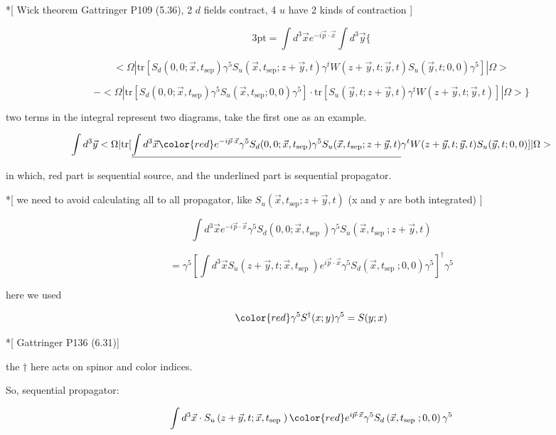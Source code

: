 \documentclass[11pt]{article} %
\begin{document}
*[ Wick theorem Gattringer P109 (5.36), 2 $d$ fields contract, 4 $u$ have 2 kinds of contraction ]

\[ \text{3pt} = \int d^{3} \vec{x} e^{-i \vec{p} \cdot \vec{x}} \int d^3 \vec{y} \{ \]

\[ <\Omega| \text{tr}[ S_d(0,0;\vec{x},t_{\text{sep}}) \gamma^{5} S_u(\vec{x},t_{\text{sep}};z+\vec{y},t) \gamma^{t} W(z+\vec{y}, t ; \vec{y}, t) S_u(\vec{y},t;0,0) \gamma^{5}  ] |\Omega> \]

\[ - <\Omega| \text{tr}[ S_d(0,0;\vec{x},t_{\text{sep}}) \gamma^{5} S_u(\vec{x},t_{\text{sep}};0,0) \gamma^{5}] \cdot \text{tr}[ S_u(\vec{y},t;z+\vec{y},t) \gamma^{t} W(z+\vec{y}, t ; \vec{y}, t) ] |\Omega> \} \]

two terms in the integral represent two diagrams, take the first one as an example.

\[ \int d^3 \vec{y} <\Omega| \text{tr}[  \underline{  \int d^{3} \vec{x} {\color{red} e^{-i \vec{p} \cdot \vec{x}} \gamma^{5}  S_d(0,0;\vec{x},t_{\text{sep}}) \gamma^{5} } S_u(\vec{x},t_{\text{sep}};z+\vec{y},t) }  \gamma^{t} W(z+\vec{y}, t ; \vec{y}, t) S_u(\vec{y},t;0,0)  ] |\Omega> \]

in which, red part is sequential source, and the underlined part is sequential propagator.

*[ we need to avoid calculating all to all propagator, like $S_u(\vec{x},t_{\text{sep}};z+\vec{y},t)$ (x and y are both integrated) ]

\[ \int d^{3} \vec{x} e^{-i \vec{p} \cdot \vec{x}} \gamma^{5} S_{d}\left(0,0 ; \vec{x}, t_{\text {sep }}\right) \gamma^{5} S_{u}\left(\vec{x}, t_{\text {sep }} ; z+\vec{y}, t\right) \]

\[ = \gamma^5 [\int d^{3} \vec{x} S_{u}\left(z+\vec{y}, t; \vec{x}, t_{\text {sep }} \right) e^{i \vec{p} \cdot \vec{x}} \gamma^{5} S_{d}\left(\vec{x}, t_{\text {sep }}; 0,0 \right) \gamma^{5} ]^{\dagger} \gamma^5 \]

here we used 

\[ {\color{red} \gamma^5 S^{\dagger}(x;y) \gamma^5 = S(y;x) } \]

*[ Gattringer P136 (6.31)]

the $\dagger$ here acts on spinor and color indices.

So, sequential propagator:

\[ \int d^{3} \vec{x} \cdot S_{u}\left(z+\vec{y}, t; \vec{x}, t_{\text {sep }} \right) {\color{red} e^{i \vec{p} \cdot \vec{x}} \gamma^{5} S_{d}\left(\vec{x}, t_{\text {sep }}; 0,0 \right) \gamma^{5} } \]
\end{document}
